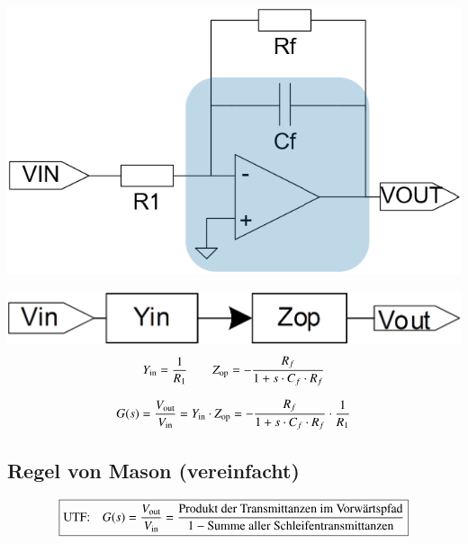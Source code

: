 \begin{minipage}[c]{0.4\columnwidth}
    \includegraphics[width=\columnwidth]{images/filter_signalflussdiagramme_tiefpass_ordnung_1.png}
\end{minipage}
\hfill
\begin{minipage}[c]{0.48\columnwidth}
    \includegraphics[width=\columnwidth]{images/filter_signalflussdiagramme_tiefpass_ordnung_1_sfd.png}
    $$ Y_{\rm in} = \frac{1}{R_1} \qquad Z_{\rm op} = - \frac{R_f}{1 + s \cdot C_f \cdot R_f} $$
\end{minipage}

$$ G(s)= \frac{V_{\rm out}}{V_{\rm in}} = Y_{\rm in} \cdot Z_{\rm op} =- \frac{R_f}{1 + s \cdot C_f \cdot R_f} \cdot \frac{1}{R_1} $$



\subsection{Regel von Mason (vereinfacht)}

$$ \boxed{ \text{UTF:} \quad G(s) = \frac{V_{\rm out}}{V_{\rm in}} = \frac{\text{Produkt der Transmittanzen im Vorwärtspfad}}{1 - \text{Summe aller Schleifentransmittanzen}} }$$



